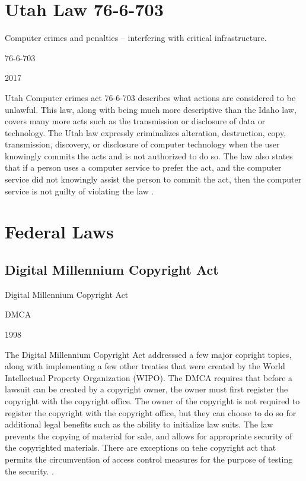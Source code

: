 \documentclass[14pt]{article}
\begin{document}
\section{Utah Law 76-6-703}
    \begin{description}[leftmargin=!, labelwidth=\widthof{\bfseries Year Approved}]
        \item [Name] Computer crimes and penalties -- interfering with critical infrastructure.
        \item [Abbreviation] 76-6-703
        \item [Year Approved] 2017
        \item [Description] Utah Computer crimes act 76-6-703 describes what actions are considered to be unlawful. This law, along with being much more descriptive than the Idaho law, covers many more acts such as the transmission or disclosure of data or technology. The Utah law expressly criminalizes alteration, destruction, copy, transmission, discovery, or disclosure of computer technology when the user knowingly commits the acts and is not authorized to do so. The law also states that if a person uses a computer service to prefer the act, and the computer service did not knowingly assist the person to commit the act, then the computer service is not guilty of violating the law \cite{Utah766703}.
    \end{description}

\section{Federal Laws}
\subsection{Digital Millennium Copyright Act}
    \begin{description}[leftmargin=!, labelwidth=\widthof{\bfseries Year Approved}]
        \item [Name] Digital Millennium Copyright Act
        \item [Abbreviation] DMCA
        \item [Year Approved] 1998
        \item [Description]  The Digital Millennium Copyright Act addresssed a few major copright topics, along with implementing a few other treaties that were created by the World Intellectual Property Organization (WIPO). The DMCA requires that before a lawsuit can be created by a copyright owner, the owner must first register the copyright with the copyright office. The owner of the copyright is not required to register the copyright with the copyright office, but they can choose to do so for additional legal benefits such as the ability to initialize law suits. The law prevents the copying of material for sale, and allows for appropriate security of the copyrighted materials. There are exceptions on tehe copyright act that permits the circumvention of access control measures for the purpose of testing the security. \cite{DMCA}.
    \end{description}
\end{document}
